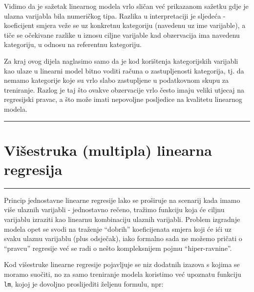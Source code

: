 \documentclass[]{book}
\theoremstyle{definition}
\theoremstyle{definition}
\theoremstyle{definition}
\theoremstyle{remark}
\begin{document}
Vidimo da je sažetak linearnog modela vrlo sličan već prikazanom sažetku
gdje je ulazna varijabla bila numeričkog tipa. Razlika u interpretaciji
je sljedeća - koeficijent smjera veže se uz konkretnu kategoriju
(navedenu uz ime varijable), a tiče se očekivane razlike u iznosu ciljne
varijable kad obzervacija ima navedenu kategoriju, u odnosu na
referentnu kategoriju.

Za kraj ovog dijela naglasimo samo da je kod korištenja kategorijskih
varijabli kao ulaze u linearni model bitno voditi računa o
zastupljenosti kategorija, tj. da nemamo kategorije koje su vrlo slabo
zastupljene u podatkovnom skupu za treniranje. Razlog je taj što ovakve
obzervacije vrlo često imaju veliki utjecaj na regresijski pravac, a što
može imati nepovoljne posljedice na kvalitetu linearnog modela.

\begin{center}\rule{0.5\linewidth}{\linethickness}\end{center}

\section{Višestruka (multipla) linearna
regresija}\label{visestruka-multipla-linearna-regresija}

\begin{center}\rule{0.5\linewidth}{\linethickness}\end{center}

Princip jednostavne linearne regresije lako se proširuje na scenarij
kada imamo više ulaznih varijabli - jednostavno rečeno, tražimo funkciju
koja će ciljnu varijablu izraziti kao linearnu kombinaciju ulaznih
varijabli. Problem izgradnje modela opet se svodi na traženje ``dobrih''
koeficijenata smjera koji će ići uz svaku ulaznu varijablu (plus
odsječak), iako formalno sada ne možemo pričati o ``pravcu'' regresije
već se radi o nešto kompleksnijem pojmu ``hiper-ravnine''.

Kod višestruke linearne regresije pojavljuje se niz dodatnih izazova s
kojima se moramo suočiti, no za samo treniranje modela koristimo već
upoznatu funkciju \texttt{lm}, kojoj je dovoljno proslijediti željenu
formulu, npr:
\end{document}
